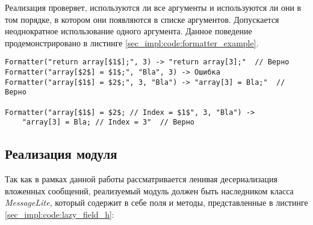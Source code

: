Реализация проверяет, используются ли все аргументы и используются ли они в том порядке, в котором они появляются в списке аргументов.
Допускается неоднократное использование одного аргумента.
Данное поведение продемонстрировано в листинге \ref{sec_impl:code:formatter_example}.

\begin{lstlisting}[style=CodeListing, label=sec_impl:code:formatter_example, caption={Пример валидации, реализованной в функторе Formatter}]
Formatter("return array[$1$];", 3) -> "return array[3];"  // Верно
Formatter("array[$2$] = $1$;", "Bla", 3) -> Ошибка
Formatter("array[$1$] = $2$;", 3, "Bla") -> "array[3] = Bla;"  // Верно

Formatter("array[$1$] = $2$; // Index = $1$", 3, "Bla") ->
    "array[3] = Bla; // Index = 3"  // Верно
\end{lstlisting}
\vspace{-1em}

\subsection{Реализация модуля}

Так как в рамках данной работы рассматривается ленивая десериализация вложенных сообщений, реализуемый модуль должен быть наследником класса \textit{MessageLite},
который содержит в себе поля и методы, представленные в листинге \ref{sec_impl:code:lazy_field_h}:

